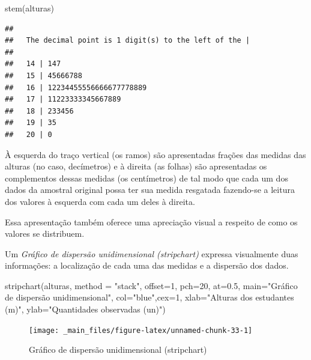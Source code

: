 \documentclass[
]{book}
\newenvironment{Shaded}{\begin{snugshade}}{\end{snugshade}}
\newcommand{\AttributeTok}[1]{\textcolor[rgb]{0.77,0.63,0.00}{#1}}
\newcommand{\DecValTok}[1]{\textcolor[rgb]{0.00,0.00,0.81}{#1}}
\newcommand{\FloatTok}[1]{\textcolor[rgb]{0.00,0.00,0.81}{#1}}
\newcommand{\FunctionTok}[1]{\textcolor[rgb]{0.00,0.00,0.00}{#1}}
\newcommand{\NormalTok}[1]{#1}
\newcommand{\StringTok}[1]{\textcolor[rgb]{0.31,0.60,0.02}{#1}}
\begin{document}
\begin{Shaded}
\begin{Highlighting}[]
\FunctionTok{stem}\NormalTok{(alturas)}
\end{Highlighting}
\end{Shaded}

\begin{verbatim}
## 
##   The decimal point is 1 digit(s) to the left of the |
## 
##   14 | 147
##   15 | 45666788
##   16 | 12234455556666677778889
##   17 | 11223333345667889
##   18 | 233456
##   19 | 35
##   20 | 0
\end{verbatim}

À esquerda do traço vertical (os ramos) são apresentadas frações das medidas das alturas (no caso, decímetros) e à direita (as folhas) são apresentadas os complementos dessas medidas (os centímetros) de tal modo que cada um dos dados da amostral original possa ter sua medida resgatada fazendo-se a leitura dos valores à esquerda com cada um deles à direita.

Essa apresentação também oferece uma apreciação visual a respeito de como os valores se distribuem.

Um \emph{Gráfico de dispersão unidimensional (stripchart)} expressa visualmente duas informações: a localização de cada uma das medidas e a dispersão dos dados.

\begin{Shaded}
\begin{Highlighting}[]
\FunctionTok{stripchart}\NormalTok{(alturas, }\AttributeTok{method =} \StringTok{"stack"}\NormalTok{, }\AttributeTok{offset=}\DecValTok{1}\NormalTok{,}
           \AttributeTok{pch=}\DecValTok{20}\NormalTok{, }\AttributeTok{at=}\FloatTok{0.5}\NormalTok{,}
           \AttributeTok{main=}\StringTok{"Gráfico de dispersão unidimensional"}\NormalTok{,}
           \AttributeTok{col=}\StringTok{"blue"}\NormalTok{,}\AttributeTok{cex=}\DecValTok{1}\NormalTok{,}
           \AttributeTok{xlab=}\StringTok{"Alturas dos estudantes (m)"}\NormalTok{,}
           \AttributeTok{ylab=}\StringTok{"Quantidades observadas (un)"}\NormalTok{)}
\end{Highlighting}
\end{Shaded}

\begin{figure}

{\centering \texttt{[image: \_main\_files/figure-latex/unnamed-chunk-33-1]} 

}

\caption{Gráfico de dispersão unidimensional (stripchart)}\label{fig:unnamed-chunk-33}
\end{figure}
\end{document}
